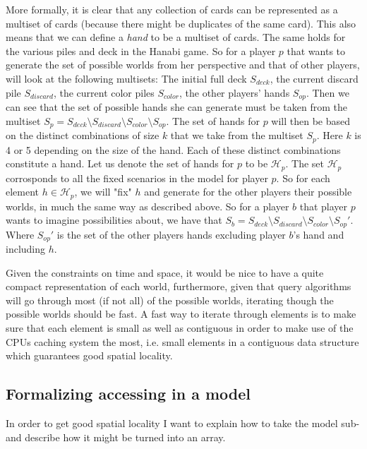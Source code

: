 More formally, it is clear that any collection of cards can be represented as a multiset of cards (because there might be duplicates of the same card). This also means that we can define a \emph{hand} to be a multiset of cards. The same holds for the various piles and deck in the Hanabi game.  
So for a player $p$ that wants to generate the set of possible worlds from her perspective and that of other players, will look at the following multisets:
The initial full deck $S_{deck}$, the current discard pile $S_{discard}$, the current color piles $S_{color}$, the other players' hands $S_{op}$. 
Then we can see that the set of possible hands she can generate must be taken from the multiset $S_{p} = S_{deck} \setminus S_{discard} \setminus S_{color} \setminus S_{op}$. 
The set of hands for $p$ will then be based on the distinct combinations of size $k$ that we take from the multiset $S_{p}$.
Here $k$ is 4 or 5 depending on the size of the hand.
Each of these distinct combinations constitute a hand.
Let us denote the set of hands for $p$ to be $\mathcal{H}_p$. The set $\mathcal{H}_p$ corrosponds to all the fixed scenarios in the model for player $p$.
So for each element $h \in \mathcal{H}_p$, we will "fix" $h$ and generate for the other players their possible worlds, in much the same way as described above. So for a player $b$ that player $p$ wants to imagine possibilities about, we have that $S_{b} = S_{deck} \setminus S_{discard} \setminus S_{color} \setminus S_{op}'$. Where $S_{op}'$ is the set of the other players hands excluding player $b$'s hand and including $h$. 

Given the constraints on time and space, it would be nice to have a quite compact representation of each world, furthermore, given that query algorithms will go through most (if not all) of the possible worlds, iterating though the possible worlds should be fast. A fast way to iterate through elements is to make sure that each element is small as well as contiguous in order to make use of the CPUs caching system the most, i.e. small elements in a contiguous data structure which guarantees good spatial locality.


\subsection{Formalizing accessing in a model} \label{sec:model-access}
In order to get good spatial locality I want to explain how to take the model sub-\KTfourfiveN and describe how it might be turned into an array.


